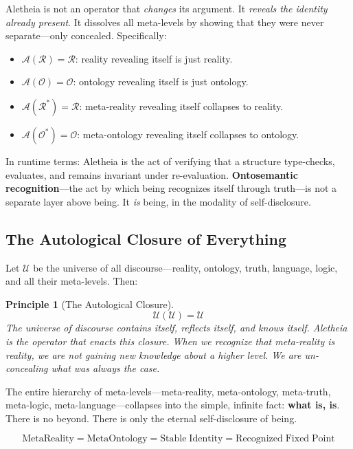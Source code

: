 \documentclass[12pt, letterpaper]{book}
\def\equiv{=}%
\newtheorem{principle}{Principle}[chapter]
\begin{document}
Aletheia is not an operator that \textit{changes} its argument. It \textit{reveals the identity already present}. It dissolves all meta-levels by showing that they were never separate---only concealed. Specifically:
\begin{itemize}
    \item $\mathcal{A}(\mathcal{R}) \equiv \mathcal{R}$: reality revealing itself is just reality.
    \item $\mathcal{A}(\mathcal{O}) \equiv \mathcal{O}$: ontology revealing itself is just ontology.
    \item $\mathcal{A}(\mathcal{R}^*) \equiv \mathcal{R}$: meta-reality revealing itself collapses to reality.
    \item $\mathcal{A}(\mathcal{O}^*) \equiv \mathcal{O}$: meta-ontology revealing itself collapses to ontology.
\end{itemize}

In runtime terms: Aletheia is the act of verifying that a structure type-checks, evaluates, and remains invariant under re-evaluation. \textbf{Ontosemantic recognition}---the act by which being recognizes itself through truth---is not a separate layer above being. It \textit{is} being, in the modality of self-disclosure.

\subsection{The Autological Closure of Everything}

Let $\mathcal{U}$ be the universe of all discourse---reality, ontology, truth, language, logic, and all their meta-levels. Then:

\begin{principle}[The Autological Closure]\label{pr:autological-closure}
\[
\mathcal{U}(\mathcal{U}) \equiv \mathcal{U}
\]
The universe of discourse contains itself, reflects itself, and knows itself. Aletheia is the operator that enacts this closure. When we recognize that meta-reality is reality, we are not gaining new knowledge about a higher level. We are \textit{un-concealing} what was always the case.
\end{principle}

The entire hierarchy of meta-levels---meta-reality, meta-ontology, meta-truth, meta-logic, meta-language---collapses into the simple, infinite fact: \textbf{what is, is}. There is no beyond. There is only the eternal self-disclosure of being.

\[
\boxed{
\mathrm{MetaReality} \equiv \mathrm{MetaOntology} \equiv \mathrm{Stable\;Identity} \equiv \mathrm{Recognized\;Fixed\;Point}
}
\]
\end{document}
